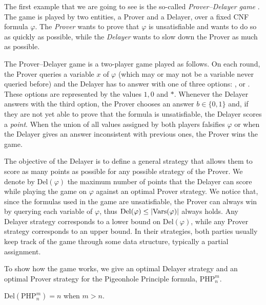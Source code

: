 The first example that we are going to see is the so-called \textit{Prover--Delayer game} \cite{pudlak_dpll, pudlak_games}. The game is played by two entities, a Prover and a Delayer, over a fixed CNF formula $\varphi$. The \textit{Prover} wants to prove that $\varphi$ is unsatisfiable and wants to do so as quickly as possible, while the \textit{Delayer} wants to slow down the Prover as much as possible.

\begin{definition}
    The Prover--Delayer game is a two-player game played as follows. On each round, the Prover queries a variable $x$ of $\varphi$ (which may or may not be a variable never queried before) and the Delayer has to answer with one of three options: ,  or . These options are represented by the values $1, 0$ and $*$. Whenever the Delayer answers with the third option, the Prover chooses an answer $b \in \{0,1\}$ and, if they are not yet able to prove that the formula is unsatisfiable, the Delayer scores a \textit{point}. When the union of all values assigned by both players falsifies $\varphi$ or when the Delayer gives an answer inconsistent with previous ones, the Prover wins the game. 
\end{definition}

The objective of the Delayer is to define a general strategy that allows them to score as many points as possible for any possible strategy of the Prover. We denote by $\mathrm{Del}(\varphi)$ the maximum number of points that the Delayer can score while playing the game on $\varphi$ against an optimal Prover strategy. We notice that, since the formulas used in the game are unsatisfiable, the Prover can always win by querying each variable of $\varphi$, thus $\mathrm{Del}(\varphi) \leq \left|\mathrm{Vars}(\varphi)\right|$ always holds. Any Delayer strategy corresponds to a lower bound on $\mathrm{Del}(\varphi)$, while any Prover strategy corresponds to an upper bound. In their strategies, both parties usually keep track of the game through some data structure, typically a partial assignment.

To show how the game works, we give an optimal Delayer strategy and an optimal Prover strategy for the Pigeonhole Principle formula, $\mathrm{PHP}^{m}_{n}$.

\begin{proposition}
    $\mathrm{Del}(\mathrm{PHP}^{m}_n) = n$ when $m > n$.
\end{proposition}

